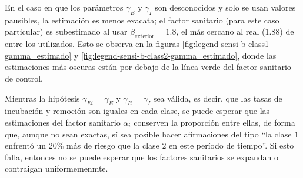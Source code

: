 En el caso en que los parámetros \(\gamma_E\) y \(\gamma_I\) son desconocidos y solo se usan valores pausibles, la estimación es menos exacata; el factor sanitario (para este caso particular) es subestimado al usar \(\beta_{\text{exterior}} = 1.8\), el más cercano al real (\(1.88\)) de entre los utilizados. Esto se observa en la figuras \ref{fig:legend-sensi-b-class1-gamma_estimado} y \ref{fig:legend-sensi-b-class2-gamma_estimado}, donde las estimaciones más oscuras están por debajo de la línea verde del factor sanitario de control.


Mientras la hipótesis \(\gamma_{Ei} = \gamma_E\) y \(\gamma_{Ii} = \gamma_I\) sea válida, es decir, que las tasas de incubación y remoción son iguales en cada clase, se puede esperar que las estimaciones del factor sanitario \(\alpha_i\) conserven la proporción entre ellas, de forma que, aunque no sean exactas, sí sea posible hacer afirmaciones del tipo ``la clase \(1\) enfrentó un 20\% más de riesgo que la clase \(2\) en este período de tiempo''. Si esto falla, entonces no se puede esperar que los factores sanitarios se expandan o contraigan uniformemenmte.





